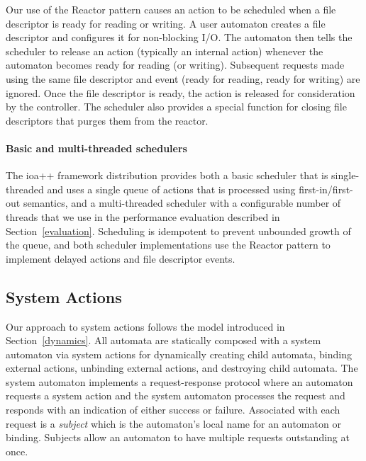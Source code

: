 Our use of the Reactor pattern causes an action to be scheduled when a file descriptor is ready for reading or writing.
A user automaton creates a file descriptor and configures it for non-blocking I/O.
The automaton then tells the scheduler to release an action (typically an internal action) whenever the automaton becomes ready for reading (or writing).
Subsequent requests made using the same file descriptor and event (ready for reading, ready for writing) are ignored.
Once the file descriptor is ready, the action is released for consideration by the controller.
The scheduler also provides a special function for closing file descriptors that purges them from the reactor.

\paragraph*{Basic and multi-threaded schedulers}
The ioa++ framework distribution provides both a basic scheduler that is single-threaded and uses a single queue of actions that is processed using first-in/first-out semantics, and a multi-threaded scheduler with a configurable number of threads that we use in the performance evaluation described in Section~\ref{evaluation}.
Scheduling is idempotent to prevent unbounded growth of the queue, and both scheduler implementations use the Reactor pattern to implement delayed actions and file descriptor events.

\subsection{System Actions\label{system_action_section}}

Our approach to system actions follows the model introduced in Section~\ref{dynamics}.
All automata are statically composed with a system automaton via system actions for dynamically creating child automata, binding external actions, unbinding external actions, and destroying child automata.
The system automaton implements a request-response protocol where an automaton requests a system action and the system automaton processes the request and responds with an indication of either success or failure.
Associated with each request is a \emph{subject} which is the automaton's local name for an automaton or binding.
Subjects allow an automaton to have multiple requests outstanding at once.

